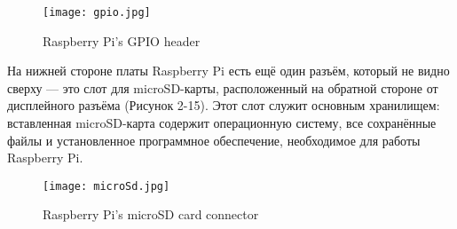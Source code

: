 \begin{figure}[H]
	\centering
	\texttt{[image: gpio.jpg]}
	\caption{Raspberry Pi’s GPIO header}
\end{figure}

На нижней стороне платы Raspberry Pi есть ещё один разъём, который не видно сверху — это слот для microSD-карты, расположенный на обратной стороне от дисплейного разъёма (Рисунок 2-15). Этот слот служит основным хранилищем: вставленная microSD-карта содержит операционную систему, все сохранённые файлы и установленное программное обеспечение, необходимое для работы Raspberry Pi.

\begin{figure}[H]
	\centering
	\texttt{[image: microSd.jpg]}
	\caption{Raspberry Pi’s microSD card connector}
\end{figure}
\newpage
